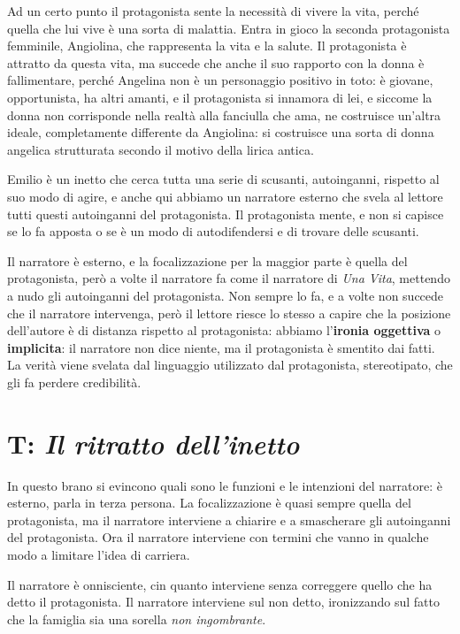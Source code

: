 \documentclass[a4paper, twoside, titlepage]{book}
\begin{document}
Ad un certo punto il protagonista sente la necessità di vivere la vita, perché quella che lui vive è una sorta di malattia.
Entra in gioco la seconda protagonista femminile, Angiolina, che rappresenta la vita e la salute.
Il protagonista è attratto da questa vita, ma succede che anche il suo rapporto con la donna è fallimentare, perché Angelina non è un personaggio positivo in toto: è giovane, opportunista, ha altri amanti, e il protagonista si innamora di lei, e siccome la donna non corrisponde nella realtà alla fanciulla che ama, ne costruisce un'altra ideale, completamente differente da Angiolina: si costruisce una sorta di donna angelica strutturata secondo il motivo della lirica antica.

Emilio è un inetto che cerca tutta una serie di scusanti, autoinganni, rispetto al suo modo di agire, e anche qui abbiamo un narratore esterno che svela al lettore tutti questi autoinganni del protagonista. Il protagonista mente, e non si capisce se lo fa apposta o se è un modo di autodifendersi e di trovare delle scusanti.

Il narratore è esterno, e la focalizzazione per la maggior parte è quella del protagonista, però a volte il narratore fa come il narratore di \textit{Una Vita}, mettendo a nudo gli autoinganni del protagonista. Non sempre lo fa, e a volte non succede che il narratore intervenga, però il lettore riesce lo stesso a capire che la posizione dell'autore è di distanza rispetto al protagonista: abbiamo l'\textbf{ironia oggettiva} o \textbf{implicita}: il narratore non dice niente, ma il protagonista è smentito dai fatti.
La verità viene svelata dal linguaggio utilizzato dal protagonista, stereotipato, che gli fa perdere credibilità.

\section{T: \textit{Il ritratto dell'inetto}}

In questo brano si evincono quali sono le funzioni e le intenzioni del narratore: è esterno, parla in terza persona. La focalizzazione è quasi sempre quella del protagonista, ma il narratore interviene a chiarire e a smascherare gli autoinganni del protagonista. Ora il narratore interviene con termini che vanno in qualche modo a limitare l'idea di carriera.

Il narratore è onnisciente, cin quanto interviene senza correggere quello che ha detto il protagonista. Il narratore interviene sul non detto, ironizzando sul fatto che la famiglia sia una sorella \textit{non ingombrante}.
\end{document}
